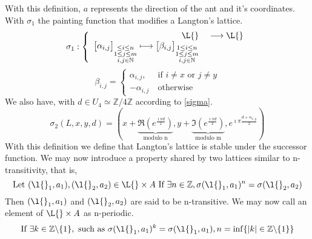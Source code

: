 \documentclass[a4paper,10pt]{article}
\begin{document}
With this definition, $a$ represents the direction of the ant and it's coordinates.
With $\sigma_1$ the painting function that modifies a Langton's lattice.
\begin{equation}
 \sigma_1:\left\{\begin{array}{rl}
           \L{} &\ \longrightarrow \L{}\\
           \begin{bmatrix}
            \alpha_{i,j}
           \end{bmatrix} _{\substack{ \leq i \leq n\\1 \leq j \leq m\\i,j \in \mathbb{N}}}  \longmapsto
           \begin{bmatrix}
            \beta_{i,j}
           \end{bmatrix} _{\substack{1 \leq i \leq n\\1 \leq j \leq m\\i,j \in \mathbb{N}}}
          \end{array}\right.
\end{equation}
\begin{equation}
       \beta_{i,j} = \left\{ \begin{array}{rl}
			  \alpha_{i,j}, &\ \text{if } i \neq x \text{ or } j \neq y\\
		         -\alpha_{i,j}  &\ \text{otherwise}
			 \end{array}\right.
\end{equation}
We also have, with $ d\in U_4 \simeq \mathbb{Z}/4\mathbb{Z}$ according to \ref{sigma}.
\begin{equation}
\label{sigma_2}
 \sigma_2 (L,x, y, d) = (x + \underbrace{\Re( e^\frac{\imath \pi d}{2})}_\text{ modulo n }, y + \underbrace{\Im(e^\frac{\imath \pi d}{2})}_\text{ modulo m }, e^{\imath \pi \frac{d+\alpha_{x,y}}{2}})
\end{equation}
\clearpage
With this definition we define that Langton's lattice is stable under the successor function. We may now introduce a property shared by two lattices similar to n-transitivity, that is,
\begin{equation}
  \text{Let } (\l{}_1, a_1), (\l{}_2, a_2) \in \L{} \times A
 \text{ If } \exists n \in \mathbb{Z}, \sigma(\l{}_1, a_1)^n = \sigma(\l{}_2, a_2)
\end{equation}
Then $(\l{}_1, a_1)$ and $(\l{}_2, a_2)$ are said to be n-transitive.
\newline
We may now call an element of $\L{} \times A$ as n-periodic. 
\begin{equation}
 \text{If } \exists k \in \mathbb{Z} \backslash \{1\}, \text{ such as } \sigma(\l{}_1, a_1)^k = \sigma(\l{}_1, a_1), n = \inf\{|k| \in \mathbb{Z} \backslash \{1\}\}     
\end{equation}
\end{document}
